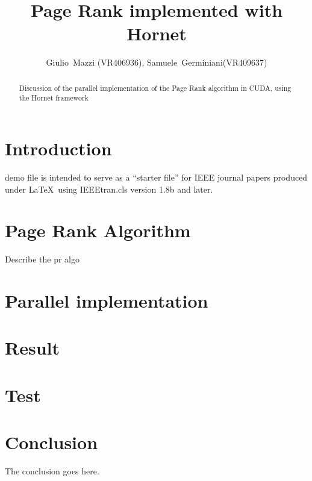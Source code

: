 \documentclass[journal]{IEEEtran}
\begin{document}
\title{Page Rank implemented with Hornet}
\author{Giulio~Mazzi (VR406936), Samuele~Germiniani(VR409637)}

\markboth{}%
{}
\maketitle

\begin{abstract}
Discussion of the parallel implementation of the Page Rank algorithm 
in CUDA, using the Hornet framework
\end{abstract}

\section{Introduction}
 demo file is intended to serve as a ``starter file''
for IEEE journal papers produced under \LaTeX\ using
IEEEtran.cls version 1.8b and later.


\section{Page Rank Algorithm}
Describe the pr algo

\section{Parallel implementation}
\section{Result}
\section{Test}
\section{Conclusion}
The conclusion goes here.
\end{document}
